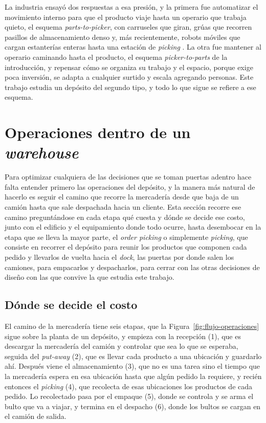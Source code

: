 La industria ensayó dos respuestas a esa presión, y la primera fue automatizar el movimiento interno para que el producto viaje hasta un operario que trabaja quieto, el esquema \emph{parts-to-picker}, con carruseles que giran, grúas que recorren pasillos de almacenamiento denso y, más recientemente, robots móviles que cargan estanterías enteras hasta una estación de \emph{picking} \citep{boysen2019warehousing}.
La otra fue mantener al operario caminando hasta el producto, el esquema \emph{picker-to-parts} de la introducción, y repensar cómo se organiza su trabajo y el espacio, porque exige poca inversión, se adapta a cualquier surtido y escala agregando personas.
Este trabajo estudia un depósito del segundo tipo, y todo lo que sigue se refiere a ese esquema.

\section{Operaciones dentro de un \emph{warehouse}}
\label{sec:operaciones}

Para optimizar cualquiera de las decisiones que se toman puertas adentro hace falta entender primero las operaciones del depósito, y la manera más natural de hacerlo es seguir el camino que recorre la mercadería desde que baja de un camión hasta que sale despachada hacia un cliente.
Esta sección recorre ese camino preguntándose en cada etapa qué cuesta y dónde se decide ese costo, junto con el edificio y el equipamiento donde todo ocurre, hasta desembocar en la etapa que se lleva la mayor parte, el \emph{order picking} o simplemente \emph{picking}, que consiste en recorrer el depósito para reunir los productos que componen cada pedido y llevarlos de vuelta hacia el \emph{dock}, las puertas por donde salen los camiones, para empacarlos y despacharlos, para cerrar con las otras decisiones de diseño con las que convive la que estudia este trabajo.

\subsection{Dónde se decide el costo}

El camino de la mercadería tiene seis etapas, que la Figura~\ref{fig:flujo-operaciones} sigue sobre la planta de un depósito, y empieza con la recepción (1), que es descargar la mercadería del camión y controlar que sea lo que se esperaba, seguida del \emph{put-away} (2), que es llevar cada producto a una ubicación y guardarlo ahí.
Después viene el almacenamiento (3), que no es una tarea sino el tiempo que la mercadería espera en esa ubicación hasta que algún pedido la requiere, y recién entonces el \emph{picking} (4), que recolecta de esas ubicaciones los productos de cada pedido.
Lo recolectado pasa por el empaque (5), donde se controla y se arma el bulto que va a viajar, y termina en el despacho (6), donde los bultos se cargan en el camión de salida.

